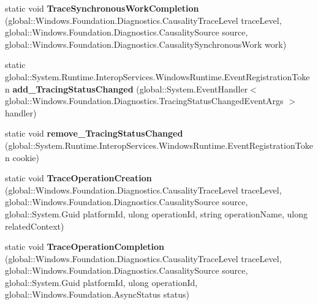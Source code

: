 \begin{DoxyCompactItemize}
\item 
\mbox{\label{class_windows_1_1_foundation_1_1_diagnostics_1_1_async_causality_tracer_a0fdd51a55dbceaaf56df6af1635b618f}} 
static void {\bfseries Trace\+Synchronous\+Work\+Completion} (global\+::\+Windows.\+Foundation.\+Diagnostics.\+Causality\+Trace\+Level trace\+Level, global\+::\+Windows.\+Foundation.\+Diagnostics.\+Causality\+Source source, global\+::\+Windows.\+Foundation.\+Diagnostics.\+Causality\+Synchronous\+Work work)
\item 
\mbox{\label{class_windows_1_1_foundation_1_1_diagnostics_1_1_async_causality_tracer_a25cca79b997614c5cff342a6177b0cc7}} 
static global\+::\+System.\+Runtime.\+Interop\+Services.\+Windows\+Runtime.\+Event\+Registration\+Token {\bfseries add\+\_\+\+Tracing\+Status\+Changed} (global\+::\+System.\+Event\+Handler$<$ global\+::\+Windows.\+Foundation.\+Diagnostics.\+Tracing\+Status\+Changed\+Event\+Args $>$ handler)
\item 
\mbox{\label{class_windows_1_1_foundation_1_1_diagnostics_1_1_async_causality_tracer_abdb7cc6e31beb6735567af4b413f9eea}} 
static void {\bfseries remove\+\_\+\+Tracing\+Status\+Changed} (global\+::\+System.\+Runtime.\+Interop\+Services.\+Windows\+Runtime.\+Event\+Registration\+Token cookie)
\item 
\mbox{\label{class_windows_1_1_foundation_1_1_diagnostics_1_1_async_causality_tracer_a7e21db63d48eac51522b889a4eaab22d}} 
static void {\bfseries Trace\+Operation\+Creation} (global\+::\+Windows.\+Foundation.\+Diagnostics.\+Causality\+Trace\+Level trace\+Level, global\+::\+Windows.\+Foundation.\+Diagnostics.\+Causality\+Source source, global\+::\+System.\+Guid platform\+Id, ulong operation\+Id, string operation\+Name, ulong related\+Context)
\item 
\mbox{\label{class_windows_1_1_foundation_1_1_diagnostics_1_1_async_causality_tracer_a6f0f3e531cde0820e070eaa0a2cb959a}} 
static void {\bfseries Trace\+Operation\+Completion} (global\+::\+Windows.\+Foundation.\+Diagnostics.\+Causality\+Trace\+Level trace\+Level, global\+::\+Windows.\+Foundation.\+Diagnostics.\+Causality\+Source source, global\+::\+System.\+Guid platform\+Id, ulong operation\+Id, global\+::\+Windows.\+Foundation.\+Async\+Status status)

\end{DoxyCompactItemize}
